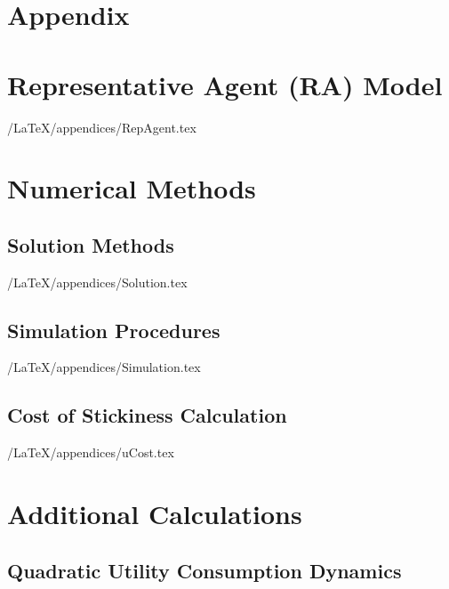 \documentclass[titlepage]{\econtex}\newcommand{\texname}{cAndCwithStickyE}
\begin{document}

\processdelayedfloats

\small

\normalsize
\pagebreak




\appendix

\section*{Appendix}

\section{Representative Agent (RA) Model}\label{sec:RepAgent}

\econtexRoot/LaTeX/appendices/RepAgent.tex




\section{Numerical Methods}\label{appendix:Numeric}

\subsection{Solution Methods}\label{appendix:Solution}

\econtexRoot/LaTeX/appendices/Solution.tex


\subsection{Simulation Procedures}\label{appendix:Simulation}

\econtexRoot/LaTeX/appendices/Simulation.tex


\subsection{Cost of Stickiness Calculation}\label{appendix:uCost}

\econtexRoot/LaTeX/appendices/uCost.tex




\section{Additional Calculations}

\subsection{Quadratic Utility Consumption Dynamics}\label{appendix:QuadCDyn}
\end{document}
